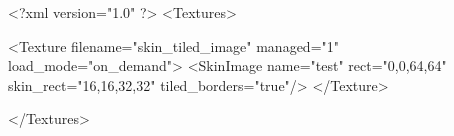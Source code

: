 <?xml version="1.0" ?>
<Textures>

	<Texture filename="skin_tiled_image" managed="1" load_mode="on_demand">
		<SkinImage name="test" rect="0,0,64,64" skin_rect="16,16,32,32" tiled_borders="true"/>
	</Texture>
	
</Textures>
